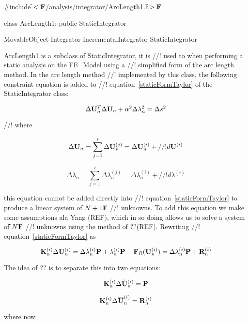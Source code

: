 
\indent \#include \f$<\tilde{ }{\bf F}$/analysis/integrator/ArcLength1.h\f$>{\bf F}$

\indent class ArcLength1: public StaticIntegrator

\indent MovableObject
\indent\indent Integrator
\indent\indent\indent IncrementalIntegrator
\indent\indent\indent\indent StaticIntegrator
\indent\indent\indent\indent{}

\indent ArcLength1 is a subclass of StaticIntegrator, it is
//! used to when performing a static analysis on the FE\_Model using a
//! simplified form of the arc length method. In the arc length method
//! implemented by this class, the following constraint equation is added to
//! equation~\ref{staticFormTaylor} of the StaticIntegrator class: 

\begin{equation}
\Delta {\bf U}_n^T \Delta {\bf U}_n  + \alpha^2 \Delta \lambda_n^2  = \Delta s^2
\end{equation}

//! where 

\[
\Delta {\bf U}_n = \sum_{j=1}^{i} \Delta {\bf U}_n^{(j)} = \Delta {\bf U}_n^{(i)} +
//! d{\bf U}^{(i)} 
\]

\[
\Delta \lambda_n = \sum_{j=1}^{i} \Delta \lambda_n^{(j)} = \Delta \lambda_n^{(i)} +
//! d\lambda^{(i)} 
\]

\noindent this equation cannot be added directly into
//! equation~\ref{staticFormTaylor} to produce a linear system of \f$N+1{\bf F}$
//! unknowns. To add this equation we make some assumptions ala Yang
(REF), which in so doing allows us to solve a system of \f$N{\bf F}$
//! unknowns using the method of ??(REF).  Rewriting
//! equation~\ref{staticFormTaylor} as  

\[
{\bf K}_n^{(i)} \Delta {\bf U}_n^{(i)} = \Delta \lambda_n^{(i)} {\bf P} +
\lambda_n^{(i)} {\bf P} - {\bf F}_R({\bf U}_n^{(i)}) = \Delta \lambda_n^{(i)} {\bf P} + {\bf R}_n^{(i)}
\]

\noindent The idea of ?? is to separate this into two equations:

\def\Uh{\dot{\bf U}}
\def\Ub{\overline{\bf U}}

\[
\K_n^{(i)} \Delta \Uh_n^{(i)} = \P
\]

\[
\K_n^{(i)} \Delta \Ub_n^{(i)} = \R_n^{(i)}
\]

\noindent where now

